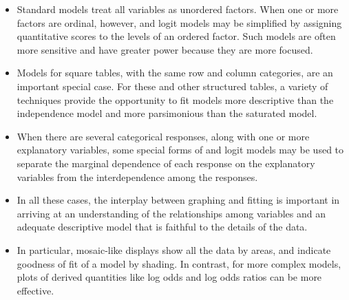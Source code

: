 \begin{itemize}

\item Standard \loglin models treat all variables as unordered factors.
When one or more factors are ordinal, however, \loglin and logit models
may be simplified by assigning quantitative scores to the levels of
an ordered factor.
Such models are often more sensitive and have greater power because they
are more focused.

\item Models for square tables, with the same row and column categories,
are an important special case. For these and other structured tables,
a variety of techniques provide the opportunity to fit models more
descriptive than the independence model and more parsimonious than
the saturated model.


\item When there are several categorical responses, along with one or
more explanatory variables, some special forms of \loglin and logit
models may be used to separate the marginal dependence of each response
on the explanatory variables from the interdependence among the responses.

\item In all these cases, the interplay between graphing and fitting is important in 
arriving at an understanding of the relationships among variables and
an adequate descriptive model that is faithful to the details of the
data. 

\item In particular, mosaic-like displays show all the data by areas, and indicate goodness of fit
of a model by shading. In contrast, for more complex models, plots of derived quantities
like log odds and log odds ratios can be more effective.


\end{itemize}

